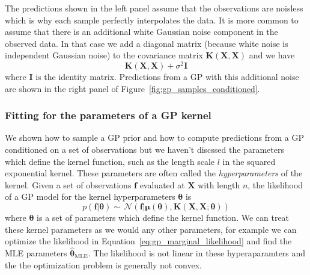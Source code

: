 \documentclass[12pt,dvipsnames]{report}
\renewcommand{\vec}[1]{\boldsymbol{\mathbf{#1}}}
\begin{document}
The predictions shown in the left panel assume that the observations are
noisless which is why each sample perfectly interpolates the data. It is more
common to assume that there is an additional white Gaussian noise component in
the observed data. In that case we add a diagonal matrix (because white noise
is independent Gaussian noise) to the covariance matrix
$\vec{K}(\vec{X},\vec{X})$ and we have
\begin{equation}
    \vec{K}(\vec{X},\vec{X}) + \sigma^2\vec{I}
\end{equation}
where $\vec{I}$ is the identity matrix. Predictions from a GP with this additional
noise are shown in the right panel of Figure~\ref{fig:gp_samples_conditioned}.

\subsubsection{Fitting for the parameters of a GP kernel}
We shown how to sample a GP prior and how to compute predictions from a GP
conditioned on a set of observations but we haven't discssed the parameters
which define the kernel function, such as the length scale $l$ in the squared
exponential kernel. These parameters are often called the
\textsl{hyperparameters} of the kernel. Given a set of observations $\vec{f}$
evaluated at $\vec{X}$ with length $n$, the likelihood of a GP model for the
kernel hyperparameters $\vec{\theta}$ is
\begin{equation}
    p(\vec{f}\lvert \vec{\theta})\sim\,
    \mathcal{N}(\vec{f}\lvert \vec{\mu}(\vec{\theta}),
    \vec{K}(\vec X, \vec X; \vec\theta))
    \label{eq:gp_marginal_likelihood}
\end{equation}
where $\vec{\theta}$ is a set of parameters which define the kernel function. We
can treat these kernel parameters as we would any other parameters, for example we
can optimize the likelihood in Equation~\ref{eq:gp_marginal_likelihood} and find the
MLE parameters $\hat{\vec{\theta}}_\mathrm{MLE}$. The likelihood is not linear in these
hyperaparamters and the the optimization problem is generally not convex.
\end{document}
